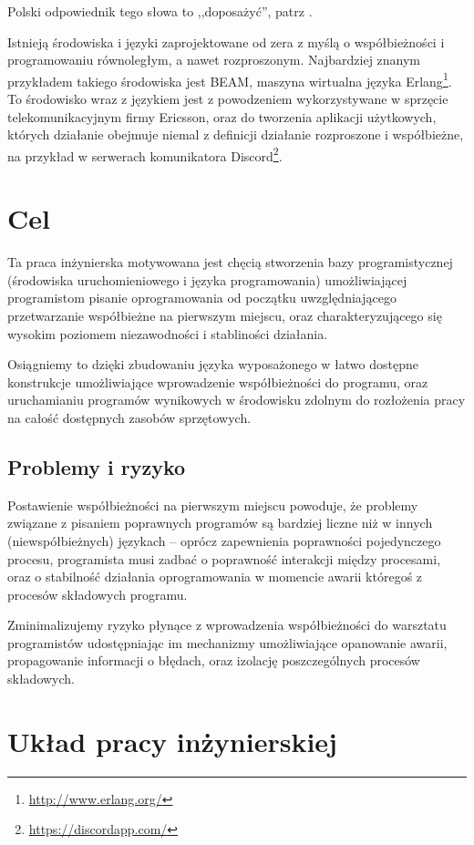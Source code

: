 Polski odpowiednik tego słowa to ,,doposażyć'', patrz \cite{PWNAngielskoPolskiRetrofit}.

Istnieją środowiska i języki zaprojektowane od zera z myślą o współbieżności i
programowaniu równoległym, a nawet rozproszonym. Najbardziej znanym przykładem
takiego środowiska jest BEAM, maszyna wirtualna języka
Erlang\footnote{\url{http://www.erlang.org/}}. To środowisko wraz z językiem
jest z powodzeniem wykorzystywane w sprzęcie telekomunikacyjnym firmy Ericsson,
oraz do tworzenia aplikacji użytkowych, których działanie obejmuje niemal z
definicji działanie rozproszone i współbieżne, na przykład w serwerach
komunikatora Discord\footnote{\url{https://discordapp.com/}}.

\section{Cel}

Ta praca inżynierska motywowana jest chęcią stworzenia bazy programistycznej
(środowiska uruchomieniowego i języka programowania) umożliwiającej programistom
pisanie oprogramowania od początku uwzględniającego przetwarzanie współbieżne na
pierwszym miejscu, oraz charakteryzującego się wysokim poziomem niezawodności i
stabliności działania.

Osiągniemy to dzięki zbudowaniu języka wyposażonego w łatwo dostępne konstrukcje
umożliwiające wprowadzenie współbieżności do programu, oraz uruchamianiu
programów wynikowych w środowisku zdolnym do rozłożenia pracy na całość
dostępnych zasobów sprzętowych.

\subsection{Problemy i ryzyko}

Postawienie współbieżności na pierwszym miejscu powoduje, że problemy związane z pisaniem poprawnych programów
są bardziej liczne niż w innych (niewspółbieżnych) językach -- oprócz zapewnienia poprawności pojedynczego
procesu, programista musi zadbać o poprawność interakcji między procesami, oraz o stabilność działania
oprogramowania w momencie awarii któregoś z procesów składowych programu.

Zminimalizujemy ryzyko płynące z wprowadzenia współbieżności do warsztatu programistów udostępniając im
mechanizmy umożliwiające opanowanie awarii, propagowanie informacji o błędach, oraz izolację poszczególnych
procesów składowych.

\section{Układ pracy inżynierskiej}

